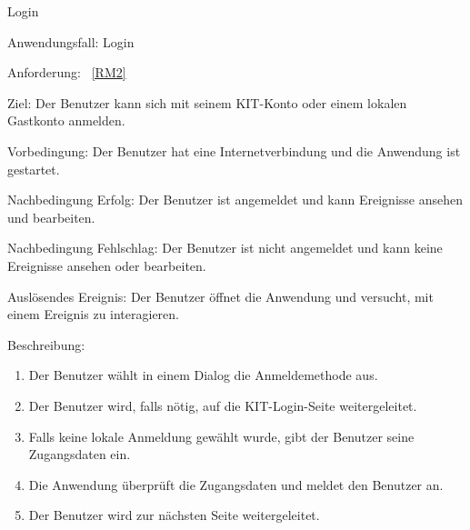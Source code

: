 \begin{function}{10}{Login}
    \item[Anwendungsfall:] Login
    \item[Anforderung:]~\ref{RM2}
    \item[Ziel:] Der Benutzer kann sich mit seinem KIT-Konto oder einem lokalen Gastkonto anmelden.
    \item[Vorbedingung:] Der Benutzer hat eine Internetverbindung und die Anwendung ist gestartet.
    \item[Nachbedingung Erfolg:] Der Benutzer ist angemeldet und kann Ereignisse ansehen und bearbeiten.
    \item[Nachbedingung Fehlschlag:] Der Benutzer ist nicht angemeldet und kann keine Ereignisse ansehen oder bearbeiten.
    \item[Auslösendes Ereignis:] Der Benutzer öffnet die Anwendung und versucht, mit einem Ereignis zu interagieren.
    \item[Beschreibung:] ~
    \begin{enumerate}
        \item Der Benutzer wählt in einem Dialog die Anmeldemethode aus.
        \item Der Benutzer wird, falls nötig, auf die KIT-Login-Seite weitergeleitet.
        \item Falls keine lokale Anmeldung gewählt wurde, gibt der Benutzer seine Zugangsdaten ein.
        \item Die Anwendung überprüft die Zugangsdaten und meldet den Benutzer an.
        \item Der Benutzer wird zur nächsten Seite weitergeleitet.
    \end{enumerate}
\end{function}
